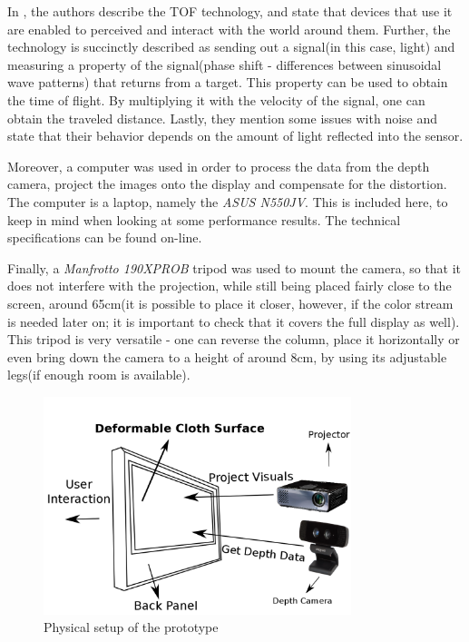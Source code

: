 \documentclass[]{article}
\begin{document}
\begin{itemize}
In \cite{gokturk}, the authors describe the TOF technology, and state that devices that use it are enabled to perceived and interact with the world around them. Further, the technology is succinctly described as sending out a signal(in this case, light) and measuring a property of the signal(phase shift - differences between sinusoidal wave patterns) that returns from a target. This property can be used to obtain the time of flight. By multiplying it with the velocity of the signal, one can obtain the traveled distance. Lastly, they mention some issues with noise and state that their behavior depends on the amount of light reflected into the sensor.
\end{itemize}


Moreover, a computer was used in order to process the data from the depth camera, project the images onto the display and compensate for the distortion. The computer is a laptop, namely the \textit{ASUS N550JV}. This is included here, to keep in mind when looking at some performance results. The technical specifications can be found on-line.

Finally, a \textit{Manfrotto 190XPROB} tripod was used to mount the camera, so that it does not interfere with the projection, while still being placed fairly close to the screen, around 65cm(it is possible to place it closer, however, if the color stream is needed later on; it is important to check that it covers the full display as well). This tripod is very versatile - one can reverse the column, place it horizontally or even bring down the camera to a height of around 8cm, by using its adjustable legs(if enough room is available).

\begin{figure}[hbtp]
    \centering
    \includegraphics[width=0.8\textwidth]{figures/thesis_setup_illustration_ui.png}
    \caption{Physical setup of the prototype}
    \label{fig:hardware_setup}
\end{figure}
\end{document}
